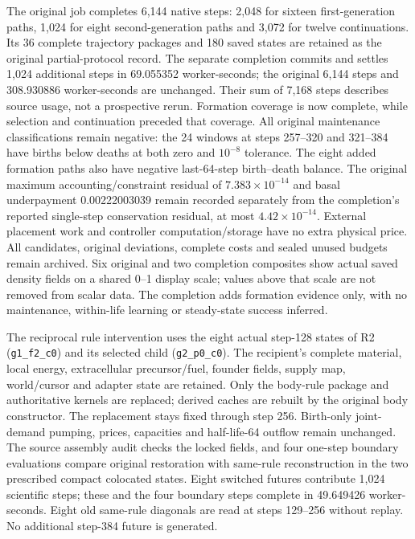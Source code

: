 The original job completes 6,144 native steps: 2,048 for sixteen first-generation paths, 1,024 for eight second-generation paths and 3,072 for twelve continuations. Its 36 complete trajectory packages and 180 saved states are retained as the original partial-protocol record. The separate completion commits and settles 1,024 additional steps in 69.055352 worker-seconds; the original 6,144 steps and 308.930886 worker-seconds are unchanged. Their sum of 7,168 steps describes source usage, not a prospective rerun. Formation coverage is now complete, while selection and continuation preceded that coverage. All original maintenance classifications remain negative: the 24 windows at steps 257--320 and 321--384 have births below deaths at both zero and $10^{-8}$ tolerance. The eight added formation paths also have negative last-64-step birth--death balance. The original maximum accounting/constraint residual of $7.383\times10^{-14}$ and basal underpayment 0.00222003039 remain recorded separately from the completion's reported single-step conservation residual, at most $4.42\times10^{-14}$. External placement work and controller computation/storage have no extra physical price. All candidates, original deviations, complete costs and sealed unused budgets remain archived. Six original and two completion composites show actual saved density fields on a shared 0--1 display scale; values above that scale are not removed from scalar data. The completion adds formation evidence only, with no maintenance, within-life learning or steady-state success inferred.

The reciprocal rule intervention uses the eight actual step-128 states of R2 (\texttt{g1\_f2\_c0}) and its selected child (\texttt{g2\_p0\_c0}). The recipient's complete material, local energy, extracellular precursor/fuel, founder fields, supply map, world/cursor and adapter state are retained. Only the body-rule package and authoritative kernels are replaced; derived caches are rebuilt by the original body constructor. The replacement stays fixed through step 256. Birth-only joint-demand pumping, prices, capacities and half-life-64 outflow remain unchanged. The source assembly audit checks the locked fields, and four one-step boundary evaluations compare original restoration with same-rule reconstruction in the two prescribed compact colocated states. Eight switched futures contribute 1,024 scientific steps; these and the four boundary steps complete in 49.649426 worker-seconds. Eight old same-rule diagonals are read at steps 129--256 without replay. No additional step-384 future is generated.

